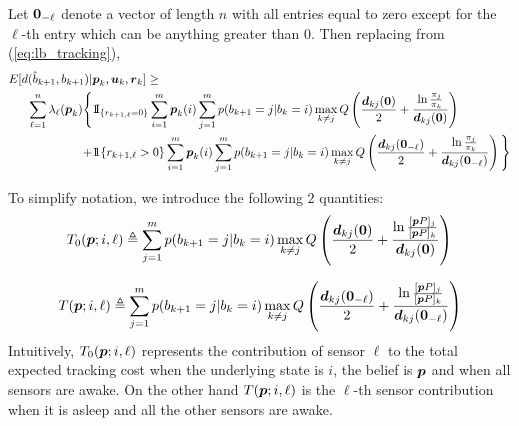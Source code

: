 \documentclass[journal,draftcls,onecolumn,11pt]{IEEEtran}
\newcommand{\emb}[1]{\text{\boldmath{$#1$}}}
\newcommand{\indic}[1]{\mbox{$1\!\!1$}{\{#1\}}}
\begin{document}
Let $\emb{0}_{-\ell}$ denote a vector of length $n$ with all entries equal to zero except for the $\ell$-th entry which can be anything greater than $0$. Then replacing from (\ref{eq:lb_tracking}),
\begin{align}
E[d(\hat{b}_{k+1},b_{k+1})|&\emb{p}_k,\emb{u}_k,\emb{r}_{k}]\geq\nonumber\\
\sum_{\ell=1}^n\lambda_{\ell}(\emb{p}_k)\Bigg\{&1{\hskip -2.5 pt}\hbox{I}_{\{r_{k+1,\ell}=0\}}\sum_{i=1}^m \emb{p}_k(i)\sum_{j=1}^m p(b_{k+1}=j|b_k=i)\max_{k\ne j}Q\left(\frac{\emb{d}_{kj}(\emb{0})}{2}+\frac{\ln\frac{\pi_j}{\pi_k}}{\emb{d}_{kj}(\emb{0})}\right)\nonumber\\
+&\indic{r_{k+1,\ell}>0}\sum_{i=1}^m \emb{p}_k(i)\sum_{j=1}^m p(b_{k+1}=j|b_k=i)\max_{k\ne j}Q\left(\frac{\emb{d}_{kj}(\emb{0}_{-\ell})}{2}+\frac{\ln\frac{\pi_j}{\pi_k}}{\emb{d}_{kj}(\emb{0}_{-\ell})}\right)\Bigg\}
\end{align}

To simplify notation, we introduce the following $2$ quantities:
\[T_0(\emb{p};i,\ell)\triangleq\sum_{j=1}^m p(b_{k+1}=j|b_k=i)\max_{k\ne j}Q\left(\frac{\emb{d}_{kj}(\emb{0})}{2}+\frac{\ln\frac{[\emb{p}P]_j}{[\emb{p}P]_k}}{\emb{d}_{kj}(\emb{0})}\right)\]

\[T(\emb{p};i,\ell) \triangleq\sum_{j=1}^m p(b_{k+1}=j|b_k=i)\max_{k\ne j}Q\left(\frac{\emb{d}_{kj}(\emb{0}_{-\ell})}{2}+\frac{\ln\frac{[\emb{p}P]_j}{[\emb{p}P]_k}}{\emb{d}_{kj}(\emb{0}_{-\ell})}\right)\]
Intuitively, $T_0(\emb{p};i,\ell)$ represents the contribution of sensor $\ell$ to the total expected tracking cost when the underlying state is $i$, the belief is $\emb{p}$ and when all sensors are awake. On the other hand $T(\emb{p};i,\ell)$ is the $\ell$-th sensor contribution when it is asleep and all the other sensors are awake.
\end{document}
